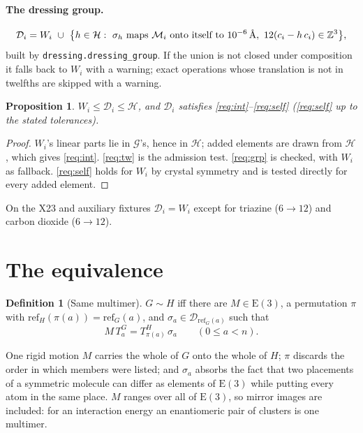 \documentclass[11pt]{article}
\newtheorem{proposition}[theorem]{Proposition}
\theoremstyle{definition}
\newtheorem{definition}[theorem]{Definition}
\newcommand{\Eth}{\mathrm{E}(3)}
\newcommand{\Grp}{\mathcal{G}}
\newcommand{\Hgrp}{\mathcal{H}}
\newcommand{\Dgrp}{\mathcal{D}}
\begin{document}
\paragraph{The dressing group.}
\begin{equation}\label{eq:D}
  \Dgrp_i=W_i\ \cup\ \bigl\{h\in\Hgrp:\ \sigma_h\text{ maps }\mathcal{M}_i\text{ onto itself to }10^{-6}\text{\,\AA},\
  12(c_i-h\,c_i)\in\mathbb{Z}^3\bigr\},
\end{equation}
built by \texttt{dressing.dressing\_group}. If the union is not closed under
composition it falls back to $W_i$ with a warning; exact operations whose
translation is not in twelfths are skipped with a warning.

\begin{proposition}\label{prop:D}
$W_i\le\Dgrp_i\le\Hgrp$, and $\Dgrp_i$ satisfies
\ref{req:int}--\ref{req:self} (\ref{req:self} up to the stated tolerances).
\end{proposition}

\begin{proof}
$W_i$'s linear parts lie in $\Grp$'s, hence in $\Hgrp$; added elements are drawn
from $\Hgrp$, which gives \ref{req:int}. \ref{req:tw} is the admission test.
\ref{req:grp} is checked, with $W_i$ as fallback. \ref{req:self} holds for $W_i$
by crystal symmetry and is tested directly for every added element.
\end{proof}

On the X23 and auxiliary fixtures $\Dgrp_i=W_i$ except for triazine
($6\to12$) and carbon dioxide ($6\to12$).

\section{The equivalence}

\begin{definition}[Same multimer]\label{def:same}
$G\sim H$ iff there are $M\in\Eth$, a permutation $\pi$ with
$\mathrm{ref}_H(\pi(a))=\mathrm{ref}_G(a)$, and
$\sigma_a\in\Dgrp_{\mathrm{ref}_G(a)}$ such that
\begin{equation}\label{eq:star}
  M\,T^G_a=T^H_{\pi(a)}\,\sigma_a\qquad(0\le a<n). \tag{$\star$}
\end{equation}
\end{definition}

One rigid motion $M$ carries the whole of $G$ onto the whole of $H$; $\pi$
discards the order in which members were listed; and $\sigma_a$ absorbs the fact
that two placements of a symmetric molecule can differ as elements of $\Eth$
while putting every atom in the same place. $M$ ranges over all of $\Eth$, so
mirror images are included: for an interaction energy an enantiomeric pair of
clusters is one multimer.
\end{document}
